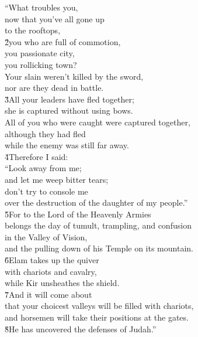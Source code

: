 \begin{poetry}
\poeml ``What troubles you, \\
\poemll    now that you've all gone up \\
\poemlll       to the rooftops, \\
\poeml \v{2}you who are full of commotion, \\
\poemll    you passionate city, \\
\poemlll       you rollicking town? \\
\poeml Your slain weren't killed by the sword, \\
\poemll    nor are they dead in battle. \\
\poeml \v{3}All your leaders have fled together; \\
\poemll    she is captured without using bows. \\
\poeml All of you who were caught were captured together, \\
\poeml although they had fled \\
\poemlll       while the enemy was still far away. \\
\poeml \v{4}Therefore I said: \\
\poemll    ``Look away from me; \\
\poemlll       and let me weep bitter tears; \\
\poeml don't try to console me \\
\poemll    over the destruction of the daughter of my people.'' \\
\poeml \v{5}For to the Lord  of the Heavenly Armies \\
\poemll    belongs the day of tumult, trampling, and confusion \\
\poemlll       in the Valley of Vision, \\
\poeml and the pulling down of his Temple on its mountain. \\
\poeml \v{6}Elam takes up the quiver \\
\poemll    with chariots and cavalry, \\
\poemlll       while Kir unsheathes the shield. \\
\poeml \v{7}And it will come about \\
\poemll    that your choicest valleys will be filled with chariots, \\
\poemlll       and horsemen will take their positions at the gates. \\
\poeml \v{8}He has uncovered the defenses of Judah.''
\end{poetry}

